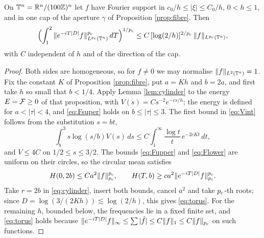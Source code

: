 \begin{proposition}\label{prop:torus}
On $\mathbb{T}^n=\mathbb{R}^n/(100\mathbb{Z})^n$ let $f$ have Fourier support in $c_0/h\le|\xi|\le C_0/h$, $0<h\le1$, and in
one cap of the aperture $\gamma$ of Proposition \ref{prop:fibre}. Then
\begin{equation}\label{eq:torus}
\Bigl(\int_1^2\|e^{-iT|D|}f\|_{L^{p_{\mathrm c}}(\mathbb{T}^n)}^{p_{\mathrm c}}\,dT\Bigr)^{1/p_{\mathrm c}}\le C\,[\log(2/h)]^{2/p_{\mathrm c}}\,\|f\|_{L^{p_{\mathrm c}}(\mathbb{T}^n)} ,
\end{equation}
with $C$ independent of $h$ and of the direction of the cap.
\end{proposition}

\begin{proof}
Both sides are homogeneous, so for $f\ne0$ we may normalise $\|f\|_{L^2(\mathbb{T}^n)}=1$. Fix the
constant $K$ of Proposition \ref{prop:fibre}, put $a=Kh$ and $b=2a$, and first take $h$ so small
that $b<1/4$. Apply Lemma \ref{lem:cylinder} to the energy $E=\mathcal F\ge0$ of that proposition, with
$V(s)=Cs^{-2}e^{-cs/h}$; the energy is defined for $a<|\tau|<4$, and \eqref{eq:Fsuper} holds on
$b\le|\tau|\le3$. The first bound in \eqref{eq:Vint} follows from the substitution $s=bt$,
\[
\int_b^3s\log(s/b)V(s)\,ds\le C\int_1^\infty\frac{\log t}{t}\,e^{-2cKt}\,dt ,
\]
and $V\le4C$ on $1/2\le s\le3/2$. The bounds \eqref{eq:Fupper} and \eqref{eq:Flower} are uniform on
their circles, so the circular mean satisfies
\[
H(0,2b)\le Ca^2\|f\|_{p_{\mathrm c}}^{p_{\mathrm c}},\qquad H(T,b)\ge ca^2\|e^{-iT|D|}f\|_{p_{\mathrm c}}^{p_{\mathrm c}}.
\]
Take $r=2b$ in \eqref{eq:cylinder}, insert both bounds, cancel $a^2$ and take $p_{\mathrm c}$-th roots; since
$D=\log(3/(2Kh))\lesssim\log(2/h)$, this gives \eqref{eq:torus}. For the remaining $h$, bounded
below, the frequencies lie in a fixed finite set, and \eqref{eq:torus} holds because
$\|e^{-iT|D|}f\|_\infty\le\sum|\hat f|\le C\|f\|_1\le C\|f\|_{p_{\mathrm c}}$ on such functions.
\end{proof}
